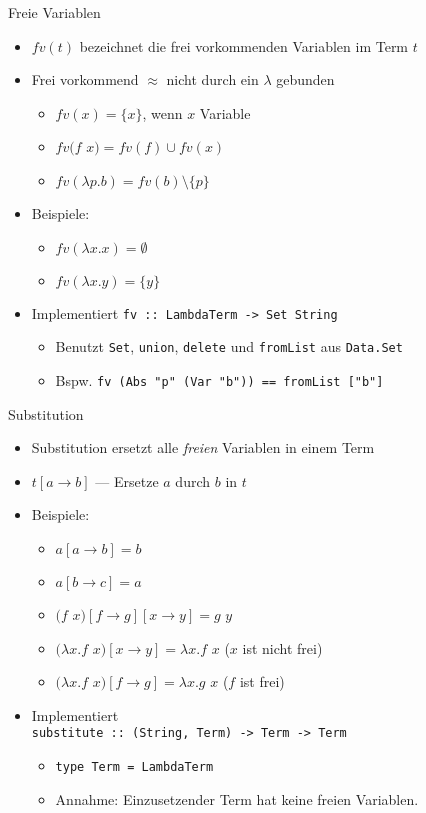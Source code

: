 \documentclass{beamer}
\begin{document}
\begin{frame}{Freie Variablen}
	\begin{itemize}
		\item $fv(t)$ bezeichnet die frei vorkommenden Variablen im Term $t$
		\item Frei vorkommend $\approx$ nicht durch ein $\lambda$ gebunden
		\begin{itemize}
			\item $fv(x) = \{x\}$, wenn $x$ Variable
			\item $fv(f$ $x) = fv(f) \cup fv(x)$
			\item $fv(\lambda{}p.b) = fv(b) \setminus \{p\}$
		\end{itemize}
		\item Beispiele:
		\begin{itemize}
			\item $fv(\lambda{}x.x) = \emptyset$
			\item $fv(\lambda{}x.y) = \{y\}$
		\end{itemize}
		\pause
		\item Implementiert \texttt{fv :: LambdaTerm -> Set String}
		\begin{itemize}
			\item Benutzt \texttt{Set}, \texttt{union}, \texttt{delete} und \texttt{fromList} aus \texttt{Data.Set}
            \item Bspw. \texttt{fv (Abs "p" (Var "b")) == fromList ["b"]}
		\end{itemize}
	\end{itemize}
\end{frame}

\begin{frame}{Substitution}
	\begin{itemize}
		\item Substitution ersetzt alle \emph{freien} Variablen in einem Term
		\item $t\left[a \to b\right]$ --- Ersetze $a$ durch $b$ in $t$
		\item Beispiele:
		\begin{itemize}
			\item $a\left[a \to b\right] = b$
			\item $a\left[b \to c\right] = a$
			\item $(f$ $x)\left[f \to g\right]\left[x \to y\right] = g$ $y$
			\pause
			\item $(\lambda{}x.f$ $x)\left[x \to y\right] = \lambda{}x.f$ $x$ ($x$ ist nicht frei)
			\item $(\lambda{}x.f$ $x)\left[f \to g\right] = \lambda{}x.g$ $x$ ($f$ ist frei)
		\end{itemize}
		\pause
		\item Implementiert\\
		      \texttt{substitute :: (String, Term) -> Term -> Term}
		\begin{itemize}
			\item \texttt{type Term = LambdaTerm}
			\item Annahme: Einzusetzender Term hat keine freien Variablen.
		\end{itemize}
	\end{itemize}
\end{frame}
\end{document}
